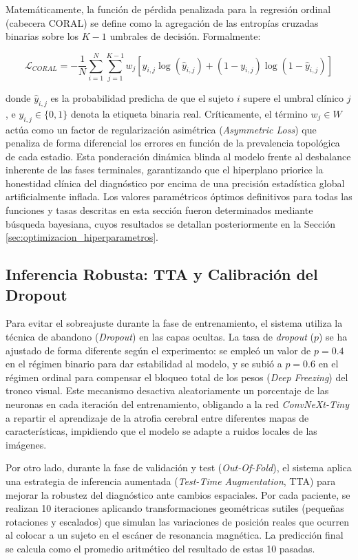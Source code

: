 \documentclass[12pt, oneside, english, spanish]{book}
\begin{document}
Matemáticamente, la función de pérdida penalizada para la regresión ordinal (cabecera CORAL) se define como la agregación de las entropías cruzadas binarias sobre los $K-1$ umbrales de decisión. Formalmente:

\begin{equation}
	\mathcal{L}_{CORAL} = - \frac{1}{N} \sum_{i=1}^{N} \sum_{j=1}^{K-1} w_j \left[ y_{i,j} \log(\hat{y}_{i,j}) + (1 - y_{i,j}) \log(1 - \hat{y}_{i,j}) \right]
\end{equation}

donde $\hat{y}_{i,j}$ es la probabilidad predicha de que el sujeto $i$ supere el umbral clínico $j$, e $y_{i,j} \in \{0,1\}$ denota la etiqueta binaria real. Críticamente, el término $w_j \in W$ actúa como un factor de regularización asimétrica (\textit{Asymmetric Loss}) que penaliza de forma diferencial los errores en función de la prevalencia topológica de cada estadio. Esta ponderación dinámica blinda al modelo frente al desbalance inherente de las fases terminales, garantizando que el hiperplano priorice la honestidad clínica del diagnóstico por encima de una precisión estadística global artificialmente inflada. Los valores paramétricos óptimos definitivos para todas las funciones y tasas descritas en esta sección fueron determinados mediante búsqueda bayesiana, cuyos resultados se detallan posteriormente en la Sección \ref{sec:optimizacion_hiperparametros}.

\subsection{Inferencia Robusta: TTA y Calibración del Dropout} \label{subsec:diseno_inferencia}

Para evitar el sobreajuste durante la fase de entrenamiento, el sistema utiliza la técnica de abandono (\textit{Dropout}) en las capas ocultas. La tasa de \textit{dropout} ($p$) se ha ajustado de forma diferente según el experimento: se empleó un valor de $p=0.4$ en el régimen binario para dar estabilidad al modelo, y se subió a $p=0.6$ en el régimen ordinal para compensar el bloqueo total de los pesos (\textit{Deep Freezing}) del tronco visual. Este mecanismo desactiva aleatoriamente un porcentaje de las neuronas en cada iteración del entrenamiento, obligando a la red \textit{ConvNeXt-Tiny} a repartir el aprendizaje de la atrofia cerebral entre diferentes mapas de características, impidiendo que el modelo se adapte a ruidos locales de las imágenes.

Por otro lado, durante la fase de validación y test (\textit{Out-Of-Fold}), el sistema aplica una estrategia de inferencia aumentada (\textit{Test-Time Augmentation}, TTA) para mejorar la robustez del diagnóstico ante cambios espaciales. Por cada paciente, se realizan 10 iteraciones aplicando transformaciones geométricas sutiles (pequeñas rotaciones y escalados) que simulan las variaciones de posición reales que ocurren al colocar a un sujeto en el escáner de resonancia magnética. La predicción final se calcula como el promedio aritmético del resultado de estas 10 pasadas.
\end{document}
